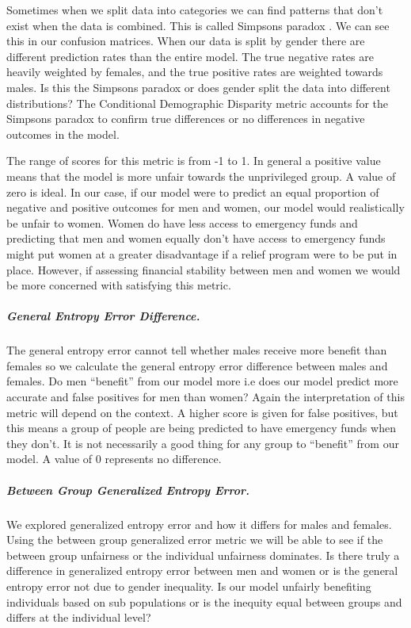 \documentclass[water,article,submit,moreauthors,pdftex]{mdpi}
\begin{document}
Sometimes when we split data into categories we can find patterns that
don't exist when the data is combined. This is called Simpsons paradox
\citep{mehrabi2021survey}. We can see this in our confusion matrices.
When our data is split by gender there are different prediction rates
than the entire model. The true negative rates are heavily weighted by
females, and the true positive rates are weighted towards males. Is this
the Simpsons paradox or does gender split the data into different
distributions? The Conditional Demographic Disparity metric accounts for
the Simpsons paradox to confirm true differences or no differences in
negative outcomes in the model.

The range of scores for this metric is from -1 to 1. In general a
positive value means that the model is more unfair towards the
unprivileged group. A value of zero is ideal. In our case, if our model
were to predict an equal proportion of negative and positive outcomes
for men and women, our model would realistically be unfair to women.
Women do have less access to emergency funds and predicting that men and
women equally don't have access to emergency funds might put women at a
greater disadvantage if a relief program were to be put in place.
However, if assessing financial stability between men and women we would
be more concerned with satisfying this metric.

\hypertarget{general-entropy-error-difference.}{%
\subparagraph{General Entropy Error
Difference.}\label{general-entropy-error-difference.}}

The general entropy error cannot tell whether males receive more benefit
than females so we calculate the general entropy error difference
between males and females. Do men ``benefit'' from our model more i.e
does our model predict more accurate and false positives for men than
women? Again the interpretation of this metric will depend on the
context. A higher score is given for false positives, but this means a
group of people are being predicted to have emergency funds when they
don't. It is not necessarily a good thing for any group to ``benefit''
from our model. A value of 0 represents no difference.

\hypertarget{between-group-generalized-entropy-error.}{%
\subparagraph{Between Group Generalized Entropy
Error.}\label{between-group-generalized-entropy-error.}}

We explored generalized entropy error and how it differs for males and
females. Using the between group generalized error metric we will be
able to see if the between group unfairness or the individual unfairness
dominates. Is there truly a difference in generalized entropy error
between men and women or is the general entropy error not due to gender
inequality. Is our model unfairly benefiting individuals based on sub
populations or is the inequity equal between groups and differs at the
individual level?
\end{document}

